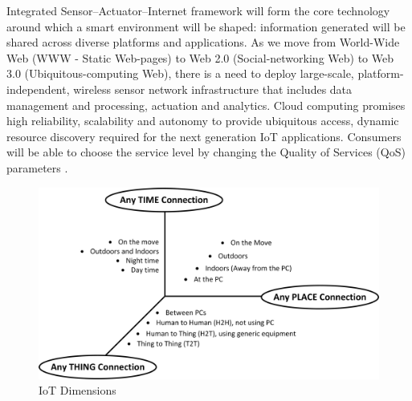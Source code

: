 Integrated Sensor–Actuator–Internet framework will form the core technology around which a smart environment will be shaped: information generated will be shared across diverse platforms and applications. As we move from World-Wide Web (\acs{WWW} - Static Web-pages) to Web 2.0 (Social-networking Web) to Web 3.0 (Ubiquitous-computing Web), there is a need to deploy large-scale, platform-independent, wireless sensor network infrastructure that includes data management and processing, actuation and analytics. Cloud computing promises high reliability, scalability and autonomy to provide ubiquitous access, dynamic resource discovery required for the next generation \acs{IoT} applications. Consumers will be able to choose the service level by changing the Quality of Services (\acs{QoS}) parameters \cite{IOTGUBBI}.
\begin{figure}[h!]
	\includegraphics[scale=0.55]{./gfx/dimension}
	\centering
	\caption{\acs{IoT} Dimensions \cite{IOTFUTURE}}
	\label{fig:2.6}
\end{figure}
